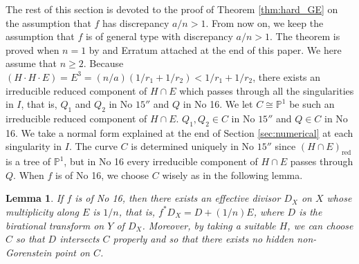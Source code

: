 \documentclass[a4paper,11pt]{amsart}
\newtheorem{lemma}[theorem]{Lemma}
\theoremstyle{definition}
\theoremstyle{remark}
\numberwithin{equation}{section}
\newcommand{\bP}{{\mathbb P}}
\newcommand{\red}{\mathrm{red}}
\begin{document}
The rest of this section is devoted to the proof of Theorem \ref{thm:hard_GE}
on the assumption that $f$ has discrepancy $a/n>1$.
From now on,
we keep the assumption that
$f$ is of general type with discrepancy $a/n>1$.
The theorem is proved when $n=1$
by \cite[Section 5]{Ka03} and Erratum attached at the end of this paper.
We here assume that $n \ge 2$.
Because $(H \cdot H \cdot E)=E^3=(n/a)(1/r_1+1/r_2)<1/r_1+1/r_2$,
there exists an irreducible reduced component of $H \cap E$
which passes through all the singularities in $I$,
that is, $Q_1$ and $Q_2$ in No $\textrm{15}''$ and $Q$ in No 16.
We let $C \cong \bP^1$ be such an irreducible reduced component of $H \cap E$.
$Q_1, Q_2 \in C$ in No $\textrm{15}''$ and $Q \in C$ in No 16.
We take a normal form explained at the end of Section \ref{sec:numerical}
at each singularity in $I$.
The curve $C$ is determined uniquely in No $\textrm{15}''$
since $(H \cap E)_\red$ is a tree of $\bP^1$,
but in No 16 every irreducible component of $H \cap E$ passes through $Q$.
When $f$ is of No 16,
we choose $C$ wisely as in the following lemma.

\begin{lemma}\label{lem:D_16}
If $f$ is of No 16,
then there exists an effective divisor $D_X$ on $X$
whose multiplicity along $E$ is $1/n$, that is,
$f^*D_X=D+(1/n)E$,
where $D$ is the birational transform on $Y$ of $D_X$.
Moreover, by taking a suitable $H$,
we can choose $C$ so that $D$ intersects $C$ properly
and so that there exists no hidden non-Gorenstein point on $C$.
\end{lemma}
\end{document}
